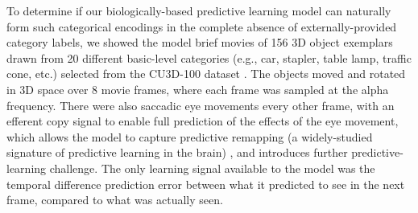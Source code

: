\documentclass[12pt,twoside]{article}
\newif\myifpdf
\begin{document}

To determine if our biologically-based predictive learning model can naturally form such categorical encodings in the complete absence of externally-provided category labels, we showed the model brief movies of 156 3D object exemplars drawn from 20 different basic-level categories (e.g., car, stapler, table lamp, traffic cone, etc.) selected from the CU3D-100 dataset \cite{OReillyWyatteHerdEtAl13}.  The objects moved and rotated in 3D space over 8 movie frames, where each frame was sampled at the alpha frequency.  There were also saccadic eye movements every other frame, with an efferent copy signal to enable full prediction of the effects of the eye movement, which allows the model to capture predictive remapping (a widely-studied signature of predictive learning in the brain) \cite{DuhamelColbyGoldberg92,CavanaghHuntAfrazEtAl10}, and introduces further predictive-learning challenge.  The only learning signal available to the model was the temporal difference prediction error between what it predicted to see in the next frame, compared to what was actually seen.  

\end{document}
